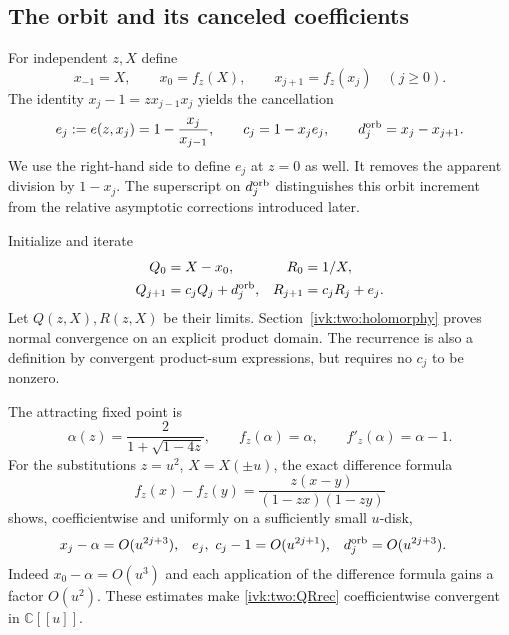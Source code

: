 \documentclass[11pt,letterpaper]{article}
\theoremstyle{remark}\newtheorem{remark}[theorem]{Remark}
\newcommand{\C}{\mathbb C}
\begin{document}
\subsection{The orbit and its canceled coefficients}
For independent $z,X$ define
\begin{equation}\label{ivk:two:orbit}
 x_{-1}=X,\qquad x_0=f_z(X),\qquad x_{j+1}=f_z(x_j)\quad(j\ge0).
\end{equation}
The identity $x_j-1=zx_{j-1}x_j$ yields the cancellation
\begin{equation}\label{ivk:two:cancellation}
 e_j:=e(z,x_j)=1-\frac{x_j}{x_{j-1}},\qquad
 c_j=1-x_je_j,\qquad d_j^{\rm orb}=x_j-x_{j+1}.
\end{equation}
We use the right-hand side to define $e_j$ at $z=0$ as well. It removes
the apparent division by $1-x_j$. The superscript on $d_j^{\rm orb}$
distinguishes this orbit increment from the relative asymptotic
corrections introduced later.

Initialize and iterate
\begin{equation}\label{ivk:two:QRrec}
\begin{aligned}
 Q_0&=X-x_0,& R_0&=1/X,\\
 Q_{j+1}&=c_jQ_j+d_j^{\rm orb},&
 R_{j+1}&=c_jR_j+e_j.
\end{aligned}
\end{equation}
Let $Q(z,X),R(z,X)$ be their limits. Section~\ref{ivk:two:holomorphy} proves
normal convergence on an explicit product domain. The recurrence is
also a definition by convergent product-sum expressions, but requires
no $c_j$ to be nonzero.

The attracting fixed point is
\begin{equation}\label{ivk:two:fixed}
 \alpha(z)=\frac2{1+\sqrt{1-4z}},\qquad
 f_z(\alpha)=\alpha,\qquad f'_z(\alpha)=\alpha-1.
\end{equation}
For the substitutions $z=u^2$, $X=X(\pm u)$, the exact difference
formula
\[
 f_z(x)-f_z(y)=\frac{z(x-y)}{(1-zx)(1-zy)}
\]
shows, coefficientwise and uniformly on a sufficiently small $u$-disk,
\begin{equation}\label{ivk:two:formalorders}
\begin{aligned}
 x_j-\alpha&=O(u^{2j+3}),&
 e_j,\ c_j-1&=O(u^{2j+1}),&
 d_j^{\rm orb}&=O(u^{2j+3}).
\end{aligned}
\end{equation}
Indeed $x_0-\alpha=O(u^3)$ and each application of the difference formula
gains a factor $O(u^2)$. These estimates make \eqref{ivk:two:QRrec}
coefficientwise convergent in $\C[[u]]$.
\end{document}
